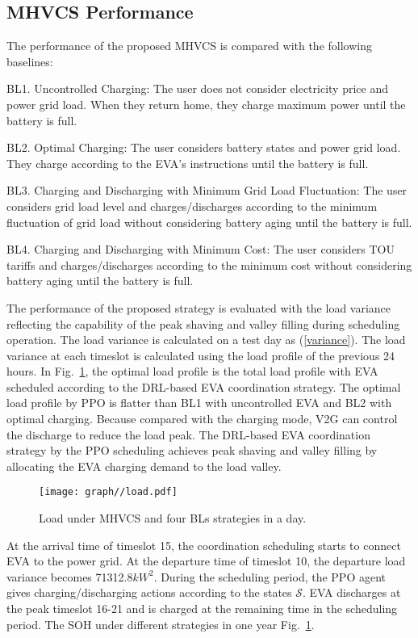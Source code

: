 \documentclass[journal,twoside]{IEEEtran}
\begin{document}
\subsection{MHVCS Performance}

The performance of the proposed MHVCS is compared with the following baselines:

BL1. Uncontrolled Charging: The user does not consider electricity price and power grid load. When they return home, they charge maximum power until the battery is full.

BL2. Optimal Charging: The user considers battery states and power grid load. They charge according to the EVA's instructions until the battery is full.

BL3. Charging and Discharging with Minimum Grid Load Fluctuation: The user considers grid load level and charges/discharges according to the minimum fluctuation of grid load without considering battery aging until the battery is full.

BL4. Charging and Discharging with Minimum Cost: The user considers TOU tariffs and charges/discharges according to the minimum cost without considering battery aging until the battery is full.

The performance of the proposed strategy is evaluated with the load variance reflecting the capability of the peak shaving and valley filling during scheduling operation. The load variance is calculated on a test day as (\ref{variance}). The load variance at each timeslot is calculated using the load profile of the previous 24 hours.
In Fig.~\ref{fig:load}, the optimal load profile is the total load profile with EVA scheduled according to the DRL-based EVA coordination strategy. The optimal load profile by PPO is flatter than BL1 with uncontrolled EVA and BL2 with optimal charging. Because compared with the charging mode, V2G can control the discharge to reduce the load peak. The DRL-based EVA coordination strategy by the PPO scheduling achieves peak shaving and valley filling by allocating the EVA charging demand to the load valley.

\begin{figure}[h]
\centering
\texttt{[image: graph//load.pdf]}
\caption{Load under MHVCS and four BLs strategies in a day.}
\label{fig:load}
\end{figure}

At the arrival time of timeslot 15, the coordination scheduling starts to connect EVA to the power grid. At the departure time of timeslot 10, the departure load variance becomes 71312.8${kW}^2$. During the scheduling period, the PPO agent gives charging/discharging actions according to the states $\mathcal{S}$. EVA discharges at the peak timeslot 16-21 and is charged at the remaining time in the scheduling period. The SOH under different strategies in one year Fig.~\ref{fig:load}.
\end{document}

